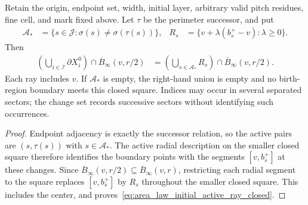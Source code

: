 \begin{lemma}
    \label{thm:area_law_initial_active_ray_closed}
    \leanok
    Retain the origin, endpoint set, width, initial layer, arbitrary
    valid pitch residues, fine cell, and mark fixed above.
    Let $\tau$ be the perimeter successor, and put
    \begin{align}
        \mathcal A_* & =\{s\in\mathcal J:\sigma(s)\ne\sigma(\tau(s))\},
                     & R_s                                              & =\{v+\lambda(b_s^+-v):\lambda\ge0\}.
    \end{align}
    Then
    \begin{align}
        \left(\bigcup_{i\in\mathcal I}\partial X_i^0\right)
        \cap\overline B_\infty(v,r/2)
         & =\left(\bigcup_{s\in\mathcal A_*}R_s\right)
        \cap\overline B_\infty(v,r/2).
        \label{eq:area_law_initial_active_ray_closed}
    \end{align}
    Each ray includes $v$. If $\mathcal A_*$ is empty, the right-hand
    union is empty and no birth-region boundary meets this closed square.
    Indices may occur in several separated sectors; the change set
    records successive sectors without identifying such occurrences.
\end{lemma}
\begin{proof}\leanok
    Endpoint adjacency is exactly the successor relation, so the active
    pairs are $(s,\tau(s))$ with $s\in\mathcal A_*$.
    The active radial description on the smaller closed square therefore identifies the boundary
    points with the segments $[v,b_s^+]$ at these changes.
    Since $\overline B_\infty(v,r/2)\subseteq\overline B_\infty(v,r)$,
    restricting each radial segment to the square replaces $[v,b_s^+]$ by $R_s$
    throughout the smaller closed square. This includes the center,
    and proves~\eqref{eq:area_law_initial_active_ray_closed}.
\end{proof}
